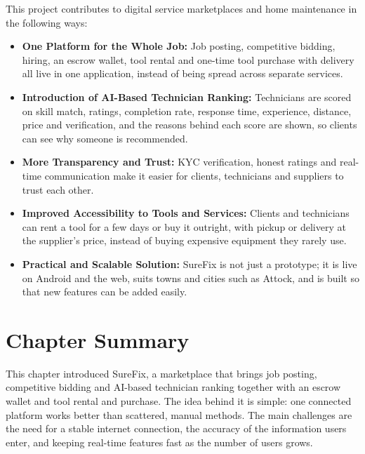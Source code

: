 \documentclass[A4paper,12pt]{report}
\theoremstyle{plain}
\theoremstyle{definition}
\theoremstyle{remark}
\numberwithin{equation}{section}
\begin{document}
This project contributes to digital service marketplaces and home maintenance in the following ways:
\begin{itemize}
        \item \textbf{One Platform for the Whole Job:} Job posting, competitive bidding, hiring, an escrow wallet, tool rental and one-time tool purchase with delivery all live in one application, instead of being spread across separate services.
        \item \textbf{Introduction of AI-Based Technician Ranking:} Technicians are scored on skill match, ratings, completion rate, response time, experience, distance, price and verification, and the reasons behind each score are shown, so clients can see why someone is recommended.
    \item \textbf{More Transparency and Trust:} KYC verification, honest ratings and real-time communication make it easier for clients, technicians and suppliers to trust each other.
        \item \textbf{Improved Accessibility to Tools and Services:} Clients and technicians can rent a tool for a few days or buy it outright, with pickup or delivery at the supplier's price, instead of buying expensive equipment they rarely use.
    \item \textbf{Practical and Scalable Solution:} SureFix is not just a prototype; it is live on Android and the web, suits towns and cities such as Attock, and is built so that new features can be added easily.
\end{itemize}


\section{ Chapter Summary }

This chapter introduced SureFix, a marketplace that brings job posting, competitive bidding and AI-based technician ranking together with an escrow wallet and tool rental and purchase. The idea behind it is simple: one connected platform works better than scattered, manual methods. The main challenges are the need for a stable internet connection, the accuracy of the information users enter, and keeping real-time features fast as the number of users grows.
\end{document}
